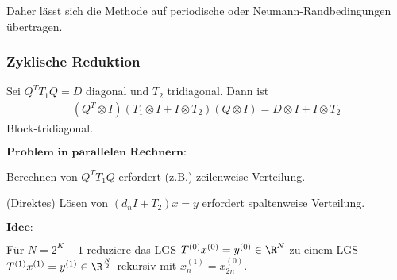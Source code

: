 Daher lässt sich die Methode auf periodische oder Neumann-Randbedingungen
übertragen.


\subsubsection{Zyklische Reduktion}

Sei $Q^T T_1 Q = D$ diagonal und $T_2$ tridiagonal. Dann ist
\begin{eqnarray*}
      (Q^T \otimes I)
      (T_1 \otimes I + I \otimes T_2) (Q \otimes I)
    = D \otimes I + I \otimes T_2
\end{eqnarray*}
Block-tridiagonal.


$\textbf{Problem \ in \ parallelen \ Rechnern:}$

Berechnen von $Q^T T_1 Q$ erfordert (z.B.) zeilenweise Verteilung.

(Direktes) Lösen von $(d_n I + T_2) x = y$ erfordert spaltenweise Verteilung.

$\textbf{Idee:}$

Für $N = 2^K - 1$ reduziere das LGS $T^{(0)} x^{(0)} = y^{(0)} \in \R^{N}$ zu
einem LGS $T^{(1)} x^{(1)} = y^{(1)} \in \R^\frac{N}{2}$ rekursiv mit
$x_n^{(1)} = x_{2n}^{(0)}$.


